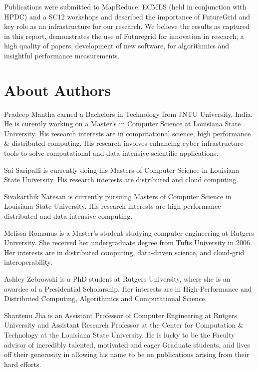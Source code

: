 \documentclass[]{paper}
\begin{document}
Publications were submitted to MapReduce, ECMLS (held in conjunction with HPDC) and a SC12 workshops and described the importance of FutureGrid and key role as an infrastructure for our research.  We believe the results as captured in this report, demonstrates the use of Futuregrid for innovation in research, a high quality of papers, development of new software, for algorithmics and insightful performance measurements.


\section{About Authors} 

Pradeep Mantha earned a Bachelors in Technology from JNTU University, India. He is curently working on a Master's in Computer Science at
Louisiana State University. His research interests are in computational science, high performance \& distributed computing. His research involves enhancing
cyber infrastructure tools to solve computational and data intensive scientific applications.

Sai Saripalli is currently doing his Masters of Computer Science in Louisiana State University. His research interests are distributed and cloud computing. 

Sivakarthik Natesan is currently pursuing Masters of Computer Science in Louisiana State University. His research interests are high performance distributed and data intensive computing.

Melissa Romanus is a Master's student studying computer engineering at Rutgers University. She received her undergraduate degree from Tufts University in 2006. Her interests are in distributed computing, data-driven science, and cloud-grid interoperability.

Ashley Zebrowski is a PhD student at Rutgers University, where she is an awardee of a Presidential Scholarship. Her interests are in High-Performance and Distributed Computing, Algorithmics and Computational Science.

Shantenu Jha is an Assistant Professor of Computer Engineering at Rutgers University and Assistant Research Professor at the Center for Computation \& Technology at the Louisiana State University. He is lucky to be the Faculty advisor of incredibly talented, motivated and eager Graduate students, and lives off their generosity in allowing his name to be on publications arising from their hard efforts.





\end{document}
